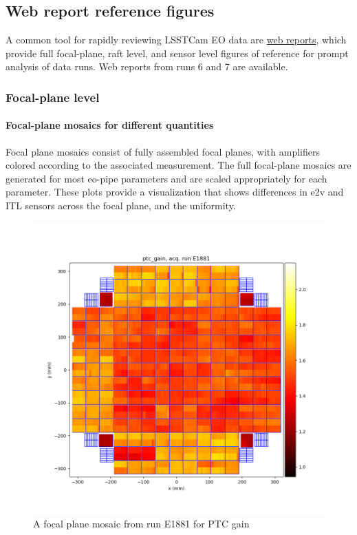 \subsection{Web report reference figures}

A common tool for rapidly reviewing LSSTCam EO data are \href{https://s3df.slac.stanford.edu/data/rubin/lsstcam/}{web reports}, which provide full focal-plane, raft level, and sensor level figures of reference for prompt analysis of data runs. Web reports from runs 6 and 7 are available.

\subsubsection{Focal-plane level}

\paragraph{Focal-plane mosaics for different quantities}

Focal plane mosaics consist of fully assembled focal planes, with amplifiers colored according to the associated measurement. The full focal-plane mosaics are generated for most eo-pipe parameters and are scaled appropriately for each parameter. These plots provide a visualization that shows differences in e2v and ITL sensors across the focal plane, and the uniformity.

\begin{figure}[ht]
    \centering
    \includegraphics[width=0.7\linewidth]{figures/ReferenceFigures/ptc_gain_plot_LSSTCam_u_lsstccs_eo_ptc_plots_E1881_w_2024_35_20241105T131208Z.png}
    \caption{A focal plane mosaic from run E1881 for PTC gain}
    \label{fig:ref:fpMosaic}
\end{figure}
\clearpage
